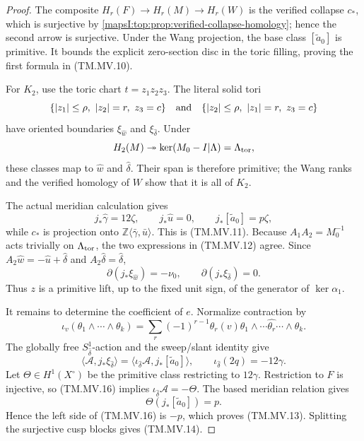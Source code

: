 \begin{proof}
The composite $H_r(F)\to H_r(M)\to H_r(W)$ is the verified collapse $c_*$,
which is surjective by \cref{mapsI:top:prop:verified-collapse-homology}; hence the
second arrow is surjective.  Under the Wang projection, the base class
$[\widetilde a_0]$ is primitive.  It bounds the explicit zero-section disc
in the toric filling, proving the first formula in (TM.MV.10).

For $K_2$, use the toric chart $t=z_1z_2z_3$.  The literal solid tori
\[
 \{|z_1|\leq\rho,\ |z_2|=r,\ z_3=c\}
 \quad\hbox{and}\quad
 \{|z_2|\leq\rho,\ |z_1|=r,\ z_3=c\}
\]
have oriented boundaries $\xi_{\widehat w}$ and
$\xi_{\widehat\delta}$.  Under
\[
 H_2(M)\twoheadrightarrow
 \ker(M_0-I|\Lambda)=\Lambda_{\rm tor},
\]
these classes map to $\widehat w$ and $\widehat\delta$.  Their span is
therefore primitive; the Wang ranks and the verified homology of $W$ show
that it is all of $K_2$.

The actual meridian calculation gives
\[
 j_*\widehat\gamma=12\zeta,
 \qquad j_*\widehat u=0,
 \qquad j_*[\widetilde a_0]=p\zeta,
\]
while $c_*$ is projection onto
$\mathbb Z\langle\bar\gamma,\bar u\rangle$.  This is (TM.MV.11).
Because $A_1A_2=M_0^{-1}$ acts trivially on $\Lambda_{\rm tor}$, the two
expressions in (TM.MV.12) agree.  Since
$A_2\widehat w=-\widehat u+\widehat\delta$ and
$A_2\widehat\delta=\widehat\delta$,
\[
 \partial(j_*\xi_{\widehat w})=-\nu_0,
 \qquad \partial(j_*\xi_{\widehat\delta})=0.
\tag{TM.MV.15}
\]
Thus $z$ is a primitive lift, up to the fixed unit sign, of the generator of
$\ker\alpha_1$.

It remains to determine the coefficient of $e$.  Normalize contraction by
\[
 \iota_v(\theta_1\wedge\cdots\wedge\theta_k)
 =\sum_r(-1)^{r-1}\theta_r(v)
   \theta_1\wedge\cdots\widehat{\theta_r}\cdots\wedge\theta_k.
\]
The globally free $S^1_{\widehat\delta}$-action and the sweep/slant identity
give
\[
 \langle\mathcal A,j_*\xi_{\widehat\delta}\rangle
 =\langle\iota_{\widehat\delta}\mathcal A,
          j_*[\widetilde a_0]\rangle,
 \qquad
 \iota_{\widehat\delta}(2q)=-12\gamma.
\tag{TM.MV.16}
\]
Let $\Theta\in H^1(X^\circ)$ be the primitive class restricting to
$12\gamma$.  Restriction to $F$ is injective, so (TM.MV.16) implies
$\iota_{\widehat\delta}\mathcal A=-\Theta$.  The based meridian relation
gives
\[
 \Theta(j_*[\widetilde a_0])=p.
\]
Hence the left side of (TM.MV.16) is $-p$, which proves (TM.MV.13).  Splitting the
surjective cusp blocks gives (TM.MV.14).
\end{proof}

